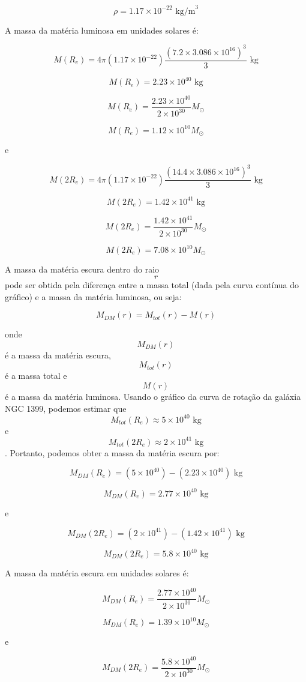 \documentclass[a4paper,12pt]{article}
\begin{document}
\begin{enumerate}
\begin{enumerate}
$$\rho = 1.17\times 10^{-22} \text{ kg/m}^3$$

A massa da matéria luminosa em unidades solares é:

$$M(R_e) = 4\pi(1.17\times 10^{-22}) \frac{(7.2\times 3.086\times 10^{16})^3}{3} \text{ kg}$$

$$M(R_e) = 2.23\times 10^{40} \text{ kg}$$

$$M(R_e) = \frac{2.23\times 10^{40}}{2\times 10^{30}} M_{\odot}$$

$$M(R_e) = 1.12\times 10^{10} M_{\odot}$$

e

$$M(2 R_e) = 4\pi(1.17\times 10^{-22}) \frac{(14.4\times 3.086\times 10^{16})^3}{3} \text{ kg}$$

$$M(2 R_e) = 1.42\times 10^{41} \text{ kg}$$

$$M(2 R_e) = \frac{1.42\times 10^{41}}{2\times 10^{30}} M_{\odot}$$

$$M(2 R_e) = 7.08\times 10^{10} M_{\odot}$$

A massa da matéria escura dentro do raio $$r$$ pode ser obtida pela diferença entre a massa total (dada pela curva contínua do gráfico) e a massa da matéria luminosa, ou seja:

$$M_{DM}(r) = M_{tot}(r) - M(r)$$

onde $$M_{DM}(r)$$ é a massa da matéria escura, $$M_{tot}(r)$$ é a massa total e $$M(r)$$ é a massa da matéria luminosa. Usando o gráfico da curva de rotação da galáxia NGC 1399, podemos estimar que $$M_{tot}(R_e) \approx 5\times 10^{40} \text{ kg}$$ e $$M_{tot}(2 R_e) \approx 2\times 10^{41} \text{ kg}$$. Portanto, podemos obter a massa da matéria escura por:

$$M_{DM}(R_e) = (5\times 10^{40}) - (2.23\times 10^{40}) \text{ kg}$$

$$M_{DM}(R_e) = 2.77\times 10^{40} \text{ kg}$$

e

$$M_{DM}(2 R_e) = (2\times 10^{41}) - (1.42\times 10^{41}) \text{ kg}$$

$$M_{DM}(2 R_e) = 5.8\times 10^{40} \text{ kg}$$

A massa da matéria escura em unidades solares é:

$$M_{DM}(R_e) = \frac{2.77\times 10^{40}}{2\times 10^{30}} M_{\odot}$$

$$M_{DM}(R_e) = 1.39\times 10^{10} M_{\odot}$$

e

$$M_{DM}(2 R_e) = \frac{5.8\times 10^{40}}{2\times 10^{30}} M_{\odot}$$


\end{enumerate}
\end{enumerate}
\end{document}
